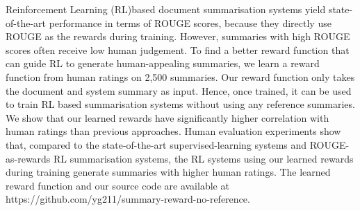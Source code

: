 Reinforcement Learning (RL)based document summarisation systems yield  state-of-the-art performance in terms of ROUGE scores, because they directly use ROUGE as the rewards during training. However, summaries with high ROUGE scores often receive low human judgement. To find a better reward function that can guide RL to generate human-appealing summaries, we learn a reward function from human ratings on 2,500 summaries. Our reward function only takes the document and system summary as input. Hence, once trained, it can be used to train RL based summarisation systems without using any reference summaries. We show that our learned rewards have significantly higher correlation with human ratings than previous approaches. Human evaluation experiments show that, compared to the state-of-the-art supervised-learning systems and ROUGE-as-rewards RL summarisation systems, the RL systems using our learned rewards during training generate summaries with higher human ratings. The learned  reward function and our source code are available at https://github.com/yg211/summary-reward-no-reference.